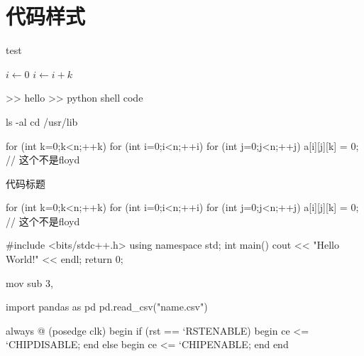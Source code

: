 \chapter{代码样式}
\begin{algorithm}
\caption{test}
\begin{algorithmic}
        \State $i\gets 0$
    \Else
            \State $i\gets i+k$
        \EndIf
    \EndIf
\end{algorithmic}
\end{algorithm}

\begin{shell}
    >> hello
    >> python
    shell code
\end{shell}

\begin{commandshell}
    ls -al
    cd /usr/lib
\end{commandshell}

\begin{latex}
    \setvar{\myname}{\name}
    \newcommand\myaddress{}
    \newcommand{\address}[1]{\renewcommand{\myaddress}{#1}}
\end{latex}

\begin{cdisplay}
    for (int k=0;k<n;++k){
        for (int i=0;i<n;++i){
            for (int j=0;j<n;++j){
                a[i][j][k] = 0;
            }
        }
    }
    // 这个不是floyd
\end{cdisplay}

\begin{algorithm}
    \caption{代码标题}
    \begin{cpseudo}
        for (int k=0;k<n;++k){
            for (int i=0;i<n;++i){
                for (int j=0;j<n;++j){
                    a[i][j][k] = 0;
                }
            }
        }
        // 这个不是floyd
    \end{cpseudo}
\end{algorithm}

\begin{cplus}
    #include <bits/stdc++.h>
    using namespace std;
    int main(){
        cout << "Hello World!" << endl;
        return 0;
    }
\end{cplus}

\begin{code}[language=Assembler]
    mov %
    sub 3, %
\end{code}

\begin{python}
    import pandas as pd
    pd.read_csv("name.csv")
\end{python}

\begin{verilog}
    always @ (posedge clk) begin
		if (rst == `RSTENABLE) begin
			ce <= `CHIPDISABLE;
		end else begin
			ce <= `CHIPENABLE;
		end
    end
\end{verilog}